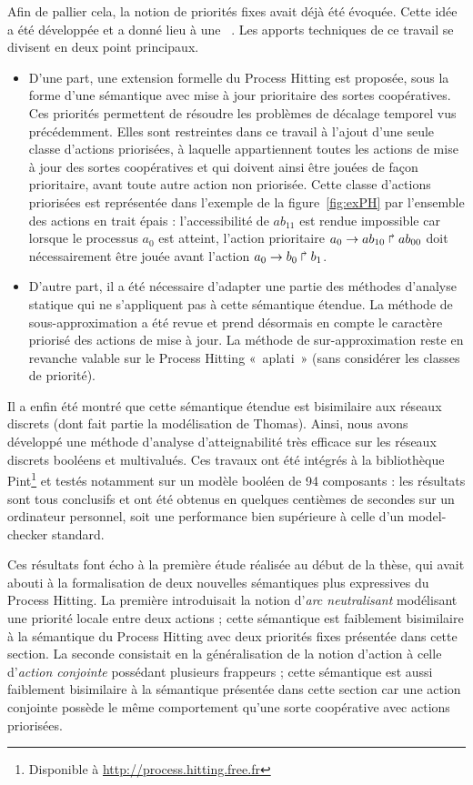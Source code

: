 Afin de pallier cela, la notion de priorités fixes avait déjà été évoquée.
Cette idée a été développée et a donné lieu à une ~\cite{FPMR13-CS3Bio}.
Les apports techniques de ce travail se divisent en deux point principaux.
\begin{itemize}
  \item D'une part, une extension formelle du Process Hitting est proposée, sous la forme d'une sémantique avec mise à jour prioritaire des sortes coopératives.
  Ces priorités permettent de résoudre les problèmes de décalage temporel vus précédemment.
  Elles sont restreintes dans ce travail à l'ajout d'une seule classe d'actions priorisées, à laquelle appartiennent toutes les actions de mise à jour des sortes coopératives et qui doivent ainsi être jouées de façon prioritaire, avant toute autre action non priorisée.
  Cette classe d'actions priorisées est représentée dans l'exemple de la figure~\ref{fig:exPH} par l'ensemble des actions en trait épais :
  l'accessibilité de $ab_{11}$ est rendue impossible car lorsque le processus $a_0$ est atteint, l'action prioritaire $a_0\rightarrow ab_{10}\Rsh ab_{00}$ doit nécessairement être jouée avant l'action $a_0\rightarrow b_0\Rsh b_1$.
  \item D'autre part, il a été nécessaire d'adapter une partie des méthodes d'analyse statique qui ne s'appliquent pas à cette sémantique étendue.
  La méthode de sous-approximation a été revue et prend désormais en compte le caractère priorisé des actions de mise à jour.
  La méthode de sur-approximation reste en revanche valable sur le Process Hitting «~aplati~» (\ie sans considérer les classes de priorité).
\end{itemize}
Il a enfin été montré que cette sémantique étendue est bisimilaire aux réseaux discrets (dont fait partie la modélisation de Thomas).
Ainsi, nous avons développé une méthode d'analyse d'atteignabilité très efficace sur les réseaux discrets booléens et multivalués.
Ces travaux ont été intégrés à la bibliothèque Pint\footnote{Disponible à \url{http://process.hitting.free.fr}} et testés notamment sur un modèle booléen de 94 composants :
les résultats sont tous conclusifs et ont été obtenus en quelques centièmes de secondes sur un ordinateur personnel,
soit une performance bien supérieure à celle d'un model-checker standard.

Ces résultats font écho à la première étude réalisée au début de la thèse, qui avait abouti à la formalisation de deux nouvelles sémantiques plus expressives du Process Hitting.
La première introduisait la notion d'\emph{arc neutralisant} modélisant une priorité locale entre deux actions ;
cette sémantique est faiblement bisimilaire à la sémantique du Process Hitting avec deux priorités fixes présentée dans cette section.
La seconde consistait en la généralisation de la notion d'action à celle d'\emph{action conjointe} possédant plusieurs frappeurs ;
cette sémantique est aussi faiblement bisimilaire à la sémantique présentée dans cette section car une action conjointe possède le même comportement qu'une sorte coopérative avec actions priorisées.



